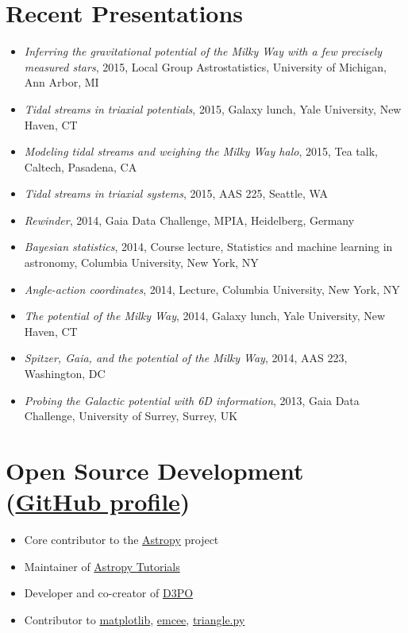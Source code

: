 \documentclass[12pt,letterpaper]{article}
\begin{document}
\section*{Recent Presentations}

\begin{itemize}
        \item \emph{Inferring the gravitational potential of the Milky Way with a few precisely measured stars}, 2015, Local Group Astrostatistics, University of Michigan, Ann Arbor, MI
        \item \emph{Tidal streams in triaxial potentials}, 2015, Galaxy lunch, Yale University, New Haven, CT
	\item \emph{Modeling tidal streams and weighing the Milky Way halo}, 2015, Tea talk, Caltech, Pasadena, CA
	\item \emph{Tidal streams in triaxial systems}, 2015, AAS 225, Seattle, WA
	\item \emph{Rewinder}, 2014, Gaia Data Challenge, MPIA, Heidelberg, Germany
	\item \emph{Bayesian statistics}, 2014, Course lecture, Statistics and machine learning in astronomy, Columbia University, New York, NY
	\item \emph{Angle-action coordinates}, 2014, Lecture, Columbia University, New York, NY
	\item \emph{The potential of the Milky Way}, 2014, Galaxy lunch, Yale University, New Haven, CT
	\item \emph{Spitzer, Gaia, and the potential of the Milky Way}, 2014, AAS 223, Washington, DC
	\item \emph{Probing the Galactic potential with 6D information}, 2013, Gaia Data Challenge, University of Surrey, Surrey, UK

\end{itemize}

\section*{Open Source Development (\href{https://github.com/adrn}{GitHub profile})}
\begin{itemize}

	\item Core contributor to the \href{http://www.astropy.org/}{Astropy} project
	\item Maintainer of \href{http://tutorials.astropy.org/}{Astropy Tutorials}
	\item Developer and co-creator of \href{http://d3po.org}{D3PO}
	\item Contributor to \href{http://matplotlib.org/}{matplotlib}, \href{http://dan.iel.fm/emcee/current/}{emcee}, \href{https://github.com/dfm/triangle.py}{triangle.py}

\end{itemize}
\end{document}
